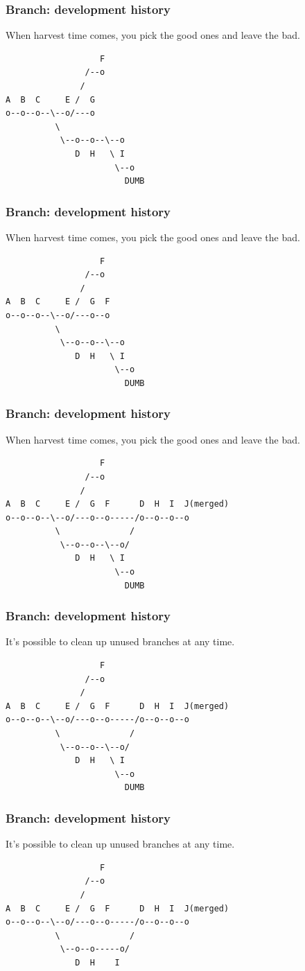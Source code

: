 \documentclass[unknownkeysallowed]{beamer}
\begin{document}
\begin{frame}[fragile]
	\frametitle{Branch: development history}
	When harvest time comes, you pick the good ones and leave the bad.
\begin{verbatim}
                   F
                /--o
               /
A  B  C     E /  G
o--o--o--\--o/---o
          \            
           \--o--o--\--o
              D  H   \ I
                      \--o
                        DUMB
\end{verbatim}
\end{frame}

\begin{frame}[fragile]
	\frametitle{Branch: development history}
	When harvest time comes, you pick the good ones and leave the bad.
\begin{verbatim}
                   F
                /--o
               /
A  B  C     E /  G  F
o--o--o--\--o/---o--o
          \            
           \--o--o--\--o
              D  H   \ I
                      \--o
                        DUMB
\end{verbatim}
\end{frame}

\begin{frame}[fragile]
	\frametitle{Branch: development history}
	When harvest time comes, you pick the good ones and leave the bad.
\begin{verbatim}
                   F
                /--o
               /
A  B  C     E /  G  F      D  H  I  J(merged)
o--o--o--\--o/---o--o-----/o--o--o--o
          \              /
           \--o--o--\--o/
              D  H   \ I
                      \--o
                        DUMB
\end{verbatim}
\end{frame}

\begin{frame}[fragile]
	\frametitle{Branch: development history}
	It's possible to clean up unused branches at any time.
\begin{verbatim}
                   F
                /--o
               /
A  B  C     E /  G  F      D  H  I  J(merged)
o--o--o--\--o/---o--o-----/o--o--o--o
          \              /
           \--o--o--\--o/
              D  H   \ I
                      \--o
                        DUMB
\end{verbatim}
\end{frame}

\begin{frame}[fragile]
	\frametitle{Branch: development history}
	It's possible to clean up unused branches at any time.
\begin{verbatim}
                   F
                /--o
               /
A  B  C     E /  G  F      D  H  I  J(merged)
o--o--o--\--o/---o--o-----/o--o--o--o
          \              /
           \--o--o-----o/
              D  H    I
                      
\end{verbatim}
\end{frame}
\end{document}
